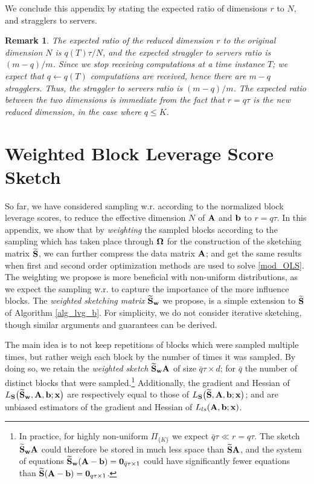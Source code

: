 \documentclass[journal,letterpaper,onecolumn,twoside,nofonttune]{IEEEtran}
\newcommand{\bb}{\bold{b}}
\newcommand{\qbar}{\bar{q}}
\newcommand{\xb}{\bold{x}}
\newcommand{\Ab}{\bold{A}}
\newcommand{\Sb}{\bold{S}}
\newcommand{\Sbwt}{\widetilde{\Sb}}
\newcommand{\Sbw}{\Sbwt_{\wb}}
\newcommand{\wb}{\bold{w}}
\newcommand{\Omb}{\bold{\Omega}}
\newtheorem{Rmk}{Remark}
\begin{document}
We conclude this appendix by stating the expected ratio of dimensions $r$ to $N$, and stragglers to servers.

\begin{Rmk}
The expected ratio of the reduced dimension $r$ to the original dimension $N$ is $q(T)\tau/N$, and the expected straggler to servers ratio is $(m-q)/m$. Since we stop receiving computations at a time instance $T$; we expect that $q\gets q(T)$ computations are received, hence there are $m-q$ stragglers. Thus, the straggler to servers ratio is $(m-q)/m$. The expected ratio between the two dimensions is immediate from the fact that $r=q\tau$ is the new reduced dimension, in the case where $q\leqslant K$.
\end{Rmk}

\section{Weighted Block Leverage Score Sketch}
\label{weighting_sec}

So far, we have considered sampling w.r. according to the normalized block leverage scores, to reduce the effective dimension $N$ of $\Ab$ and $\bb$ to $r=q\tau$. In this appendix, we show that by \textit{weighting} the sampled blocks according to the sampling which has taken place through $\Omb$ for the construction of the sketching matrix $\Sbwt$, we can further compress the data matrix $\Ab$; and get the same results when first and second order optimization methods are used to solve \eqref{mod_OLS}. The weighting we propose is more beneficial with non-uniform distributions, as we expect the sampling w.r. to capture the importance of the more influence blocks. The \textit{weighted sketching matrix} $\Sbw$ we propose, is a simple extension to $\Sbwt$ of Algorithm \ref{alg_lvg_b}. For simplicity, we do not consider iterative sketching, though similar arguments and guarantees can be derived.

The main idea is to not keep repetitions of blocks which were sampled multiple times, but rather weigh each block by the number of times it was sampled. By doing so, we retain the \textit{weighted sketch} $\Sbw\Ab$ of size $\qbar\tau\times d$; for $\qbar$ the number of distinct blocks that were sampled.\footnote{In practice, for highly non-uniform $\Pi_{\{K\}}$ we expect $\qbar\tau\ll r=q\tau$. The sketch $\Sbw\Ab$ could therefore be stored in much less space than $\Sbwt\Ab$, and the system of equations $\Sbw(\Ab-\bb)=\bold{0}_{\qbar\tau\times1}$ could have significantly fewer equations than $\Sbwt(\Ab-\bb)=\bold{0}_{q\tau\times1}$.} Additionally, the gradient and Hessian of $L_\Sb\big(\Sbw,\Ab,\bb;\xb\big)$ are respectively equal to those of $L_\Sb\big(\Sbwt,\Ab,\bb;\xb\big)$; and are unbiased estimators of the gradient and Hessian of $L_{ls}(\Ab,\bb;\xb)$.
\end{document}
